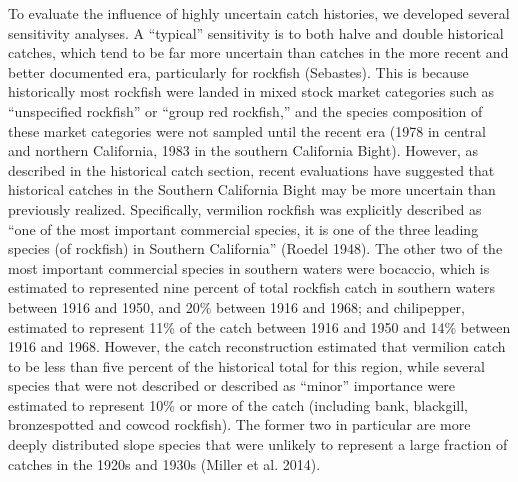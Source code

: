 \documentclass[11pt,
  english,
  a4paper,
]{article}
\begin{document}
To evaluate the influence of highly uncertain catch histories, we developed several sensitivity analyses. A ``typical'' sensitivity is to both halve and double historical catches, which tend to be far more uncertain than catches in the more recent and better documented era, particularly for rockfish (Sebastes). This is because historically most rockfish were landed in mixed stock market categories such as ``unspecified rockfish'' or ``group red rockfish,'' and the species composition of these market categories were not sampled until the recent era (1978 in central and northern California, 1983 in the southern California Bight). However, as described in the historical catch section, recent evaluations have suggested that historical catches in the Southern California Bight may be more uncertain than previously realized. Specifically, vermilion rockfish was explicitly described as ``one of the most important commercial species, it is one of the three leading species (of rockfish) in Southern California'' {(Roedel 1948)\leavevmode\tagmcend\tagstructend}. The other two of the most important commercial species in southern waters were bocaccio, which is estimated to represented nine percent of total rockfish catch in southern waters between 1916 and 1950, and 20\% between 1916 and 1968; and chilipepper, estimated to represent 11\% of the catch between 1916 and 1950 and 14\% between 1916 and 1968. However, the catch reconstruction estimated that vermilion catch to be less than five percent of the historical total for this region, while several species that were not described or described as ``minor'' importance were estimated to represent 10\% or more of the catch (including bank, blackgill, bronzespotted and cowcod rockfish). The former two in particular are more deeply distributed slope species that were unlikely to represent a large fraction of catches in the 1920s and 1930s {(Miller et al. 2014)\leavevmode\tagmcend\tagstructend}.
\end{document}
